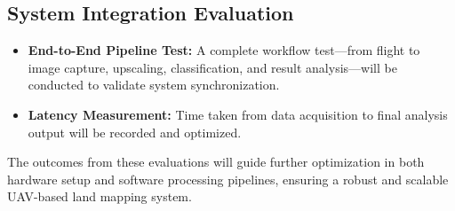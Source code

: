 \subsection{System Integration Evaluation}
\begin{itemize}
    \item \textbf{End-to-End Pipeline Test:} A complete workflow test—from flight to image capture, upscaling, classification, and result analysis—will be conducted to validate system synchronization.
    \item \textbf{Latency Measurement:} Time taken from data acquisition to final analysis output will be recorded and optimized.
\end{itemize}

The outcomes from these evaluations will guide further optimization in both hardware setup and software processing pipelines, ensuring a robust and scalable UAV-based land mapping system.

